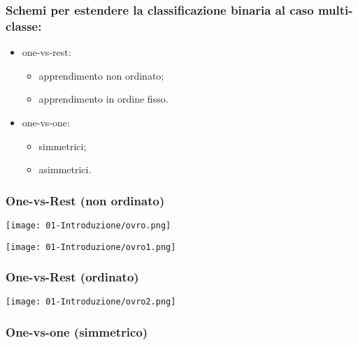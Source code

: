 \subsubsection{Schemi per estendere la classificazione binaria al caso multi-classe:}


\begin{itemize}
  \item one-vs-rest:
    \begin{itemize}
      \item apprendimento non ordinato;
      \item apprendimento in ordine fisso.
    \end{itemize}
  \item one-vs-one:
    \begin{itemize}
      \item simmetrici;
      \item asimmetrici.
    \end{itemize}
\end{itemize}

\subsubsection{One-vs-Rest (non ordinato)}

\begin{center} 
 \texttt{[image: 01-Introduzione/ovro.png]}
\end{center}


\begin{center} 
 \texttt{[image: 01-Introduzione/ovro1.png]}
\end{center}

\subsubsection{One-vs-Rest (ordinato)}

\begin{center} 
 \texttt{[image: 01-Introduzione/ovro2.png]}
\end{center}

\subsubsection{One-vs-one (simmetrico)}

